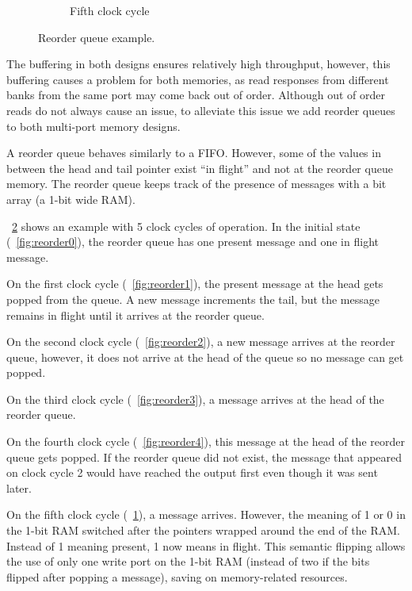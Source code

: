 \begin{figure}
\begin{subfigure}{.32\linewidth}
\begin{tikzpicture}
            \end{tikzpicture}
            \caption{Fifth clock cycle}
            \label{fig:reorder5}
        \end{subfigure}
        \caption[Reorder queue]{Reorder queue example.}
        \label{fig:reorder}
    \end{figure}

    The buffering in both designs ensures relatively high throughput, however, this buffering causes a problem for both memories, as read responses from different banks from the same port may come back out of order. Although out of order reads do not always cause an issue, to alleviate this issue we add reorder queues to both multi-port memory designs.

    A reorder queue behaves similarly to a FIFO. However, some of the values in between the head and tail pointer exist ``in flight'' and not at the reorder queue memory. The reorder queue keeps track of the presence of messages with a bit array (a 1-bit wide RAM).

    \figurename~\ref{fig:reorder} shows an example with 5 clock cycles of operation. In the initial state (\figurename~\ref{fig:reorder0}), the reorder queue has one present message and one in flight message.

         On the first clock cycle (\figurename~\ref{fig:reorder1}), the present message at the head gets popped from the queue. A new message increments the tail, but the message remains in flight until it arrives at the reorder queue.

         On the second clock cycle (\figurename~\ref{fig:reorder2}), a new message arrives at the reorder queue, however, it does not arrive at the head of the queue so no message can get popped.

         On the third clock cycle (\figurename~\ref{fig:reorder3}), a message arrives at the head of the reorder queue.

         On the fourth clock cycle (\figurename~\ref{fig:reorder4}), this message at the head of the reorder queue gets popped. If the reorder queue did not exist, the message that appeared on clock cycle 2 would have reached the output first even though it was sent later.

         On the fifth clock cycle (\figurename~\ref{fig:reorder5}), a message arrives. However, the meaning of 1 or 0 in the 1-bit RAM switched after the pointers wrapped around the end of the RAM. Instead of 1 meaning present, 1 now means in flight. This semantic flipping allows the use of only one write port on the 1-bit RAM (instead of two if the bits flipped after popping a message), saving on memory-related resources. 

